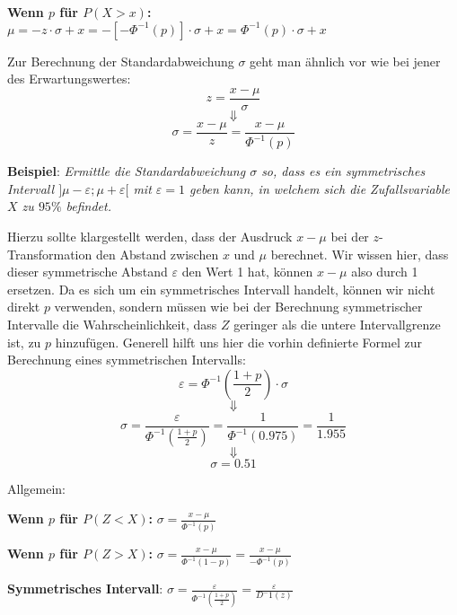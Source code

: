 \textbf{Wenn $p$ f\"{u}r $P(X > x)$:} $\mu = -z \cdot \sigma + x = -[-\Phi^{-1}(p)] \cdot \sigma + x = \Phi^{-1}(p) \cdot \sigma + x$

\pagebreak


Zur Berechnung der Standardabweichung $\sigma$ geht man \"{a}hnlich vor wie bei jener des Erwartungswertes: $$z = \frac{x - \mu}{\sigma}$$ $$\Downarrow$$ $$ \sigma = \frac{x - \mu}{z} = \frac{x - \mu}{\Phi^{-1}(p)}$$

\textbf{Beispiel}: \emph{Ermittle die Standardabweichung $\sigma$ so, dass es ein symmetrisches Intervall $]\mu - \varepsilon ; \mu + \varepsilon[$ mit $\varepsilon = 1$ geben kann, in welchem sich die Zufallsvariable $X$ zu $95 \%$ befindet.}

Hierzu sollte klargestellt werden, dass der Ausdruck $x - \mu$ bei der $z$-Transformation den Abstand zwischen $x$ und $\mu$ berechnet. Wir wissen hier, dass dieser symmetrische Abstand $\varepsilon$ den Wert 1 hat, k\"{o}nnen $x-\mu$ also durch 1 ersetzen. Da es sich um ein symmetrisches Intervall handelt, k\"{o}nnen wir nicht direkt $p$ verwenden, sondern m\"{u}ssen wie bei der Berechnung symmetrischer Intervalle die Wahrscheinlichkeit, dass $Z$ geringer als die untere Intervallgrenze ist, zu $p$ hinzuf\"{u}gen. Generell hilft uns hier die vorhin definierte Formel zur Berechnung eines symmetrischen Intervalls: $$\varepsilon = \Phi^{-1}\left(\frac{1 + p}{2}\right) \cdot \sigma$$ $$\Downarrow$$ $$\sigma = \frac{\varepsilon}{\Phi^{-1}\left(\frac{1 + p}{2}\right)} = \frac{1}{\Phi^{-1}(0.975)} = \frac{1}{1.955}$$ $$\Downarrow$$ $$\sigma = 0.51$$

Allgemein:

\textbf{Wenn $p$ f\"{u}r $P(Z < X)$:} $\sigma = \frac{x - \mu}{\Phi^{-1}(p)}$

\textbf{Wenn $p$ f\"{u}r $P(Z > X)$:} $\sigma = \frac{x - \mu}{\Phi^{-1}(1 - p)} = \frac{x - \mu}{-\Phi^{-1}(p)}$

\textbf{Symmetrisches Intervall}: $\sigma = \frac{\varepsilon}{\Phi^{-1}\left(\frac{1 + p}{2}\right)} = \frac{\varepsilon}{D^-1(z)}$


